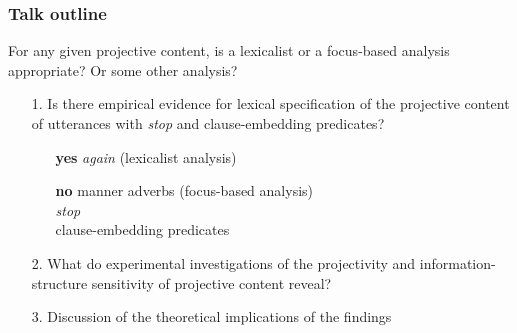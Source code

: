 \documentclass[pdf,xcolor=table,envcountsect,handout]{beamer}
\begin{document}
\begin{frame}
\frametitle{Talk outline}

For any given projective content, is a lexicalist or a focus-based analysis appropriate? Or some other analysis?

\begin{itemize}

\item[1.] Is there empirical evidence for lexical specification of the projective content of utterances with {\em stop} and clause-embedding predicates?

\begin{itemize}[leftmargin=8ex]

\item[{\bf yes}] {\em again} (lexicalist analysis)

\item[{\bf no}] manner adverbs (focus-based analysis) 
\pause
\\ {\em stop} \\ clause-embedding predicates

\end{itemize}

\bigskip
\pause

\item[2.] \color{amber}What do experimental investigations of the projectivity and information-structure sensitivity of projective content reveal?\color{black}

\bigskip

\item[3.] Discussion of the theoretical implications of the findings

\end{itemize}

\end{frame}

%
%
%
%
%
%
%
%
%
%
%
\end{document}
